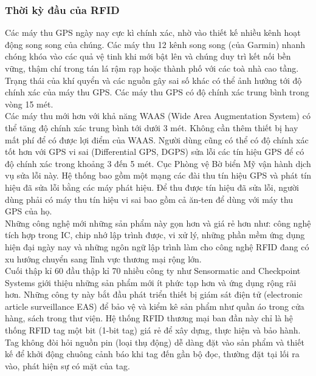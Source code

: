 \subsubsection{Thời kỳ đầu của RFID}
Các máy thu GPS ngày nay cực kì chính xác, nhờ vào thiết kế nhiều kênh hoạt động song song của chúng. Các máy thu 12 kênh song song (của Garmin) nhanh chóng khóa vào các quả vệ tinh khi mới bật lên và chúng duy trì kết nối bền vững, thậm chí trong tán lá rậm rạp hoặc thành phố với các toà nhà cao tầng. Trạng thái của khí quyển và các nguồn gây sai số khác có thể ảnh hưởng tới độ chính xác của máy thu GPS. Các máy thu GPS có độ chính xác trung bình trong vòng 15 mét.\\
Các máy thu mới hơn với khả năng WAAS (Wide Area Augmentation System) có thể tăng độ chính xác trung bình tới dưới 3 mét. Không cần thêm thiết bị hay mất phí để có được lợi điểm của WAAS. Người dùng cũng có thể có độ chính xác tốt hơn với GPS vi sai (Differential GPS, DGPS) sửa lỗi các tín hiệu GPS để có độ chính xác trong khoảng 3 đến 5 mét. Cục Phòng vệ Bờ biển Mỹ vận hành dịch vụ sửa lỗi này. Hệ thống bao gồm một mạng các đài thu tín hiệu GPS và phát tín hiệu đã sửa lỗi bằng các máy phát hiệu. Để thu được tín hiệu đã sửa lỗi, người dùng phải có máy thu tín hiệu vi sai bao gồm cả ăn-ten để dùng với máy thu GPS của họ.
\label{ref{fig2_1}}
\\
Những công nghệ mới những sản phẩm này gọn hơn và giá rẻ hơn như: công nghệ tích hợp trong IC, chip nhớ lập trình được, vi xử lý, những phần mềm ứng dụng hiện đại ngày nay và những ngôn ngữ lập trình làm cho công nghệ RFID đang có xu hướng chuyển sang lĩnh vực thương mại rộng lớn.\\
Cuối thập kỉ 60 đầu thập kỉ 70 nhiều công ty như Sensormatic and Checkpoint Systems giới thiệu những sản phẩm mới ít phức tạp hơn và ứng dụng rộng rãi hơn. Những công ty này bắt đầu phát triển thiết bị giám sát điện tử (electronic article surveillance EAS) để bảo vệ và kiểm kê sản phẩm như quần áo trong cửa hàng, sách trong thư viện. Hệ thống RFID thương mại ban đần này chỉ là hệ thống RFID tag một bit (1-bit tag) giá rẻ để xây dựng, thực hiện và bảo hành. Tag không đòi hỏi nguồn pin (loại thụ động) dễ dàng đặt vào sản phẩm và thiết kế để khởi động chuông cảnh báo khi tag đến gần bộ đọc, thường đặt tại lối ra vào, phát hiện sự có mặt của tag.	
\label{ref{fig2_2}}

